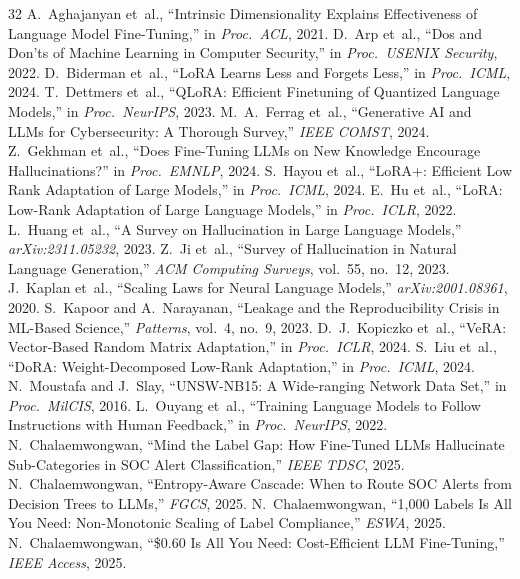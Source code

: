 \documentclass[journal]{IEEEtran}
\begin{document}
\begin{thebibliography}{32}
 A.~Aghajanyan et~al., ``Intrinsic Dimensionality Explains Effectiveness of Language Model Fine-Tuning,'' in \emph{Proc.\ ACL}, 2021.
 D.~Arp et~al., ``Dos and Don'ts of Machine Learning in Computer Security,'' in \emph{Proc.\ USENIX Security}, 2022.
 D.~Biderman et~al., ``LoRA Learns Less and Forgets Less,'' in \emph{Proc.\ ICML}, 2024.
 T.~Dettmers et~al., ``QLoRA: Efficient Finetuning of Quantized Language Models,'' in \emph{Proc.\ NeurIPS}, 2023.
 M.~A.~Ferrag et~al., ``Generative AI and LLMs for Cybersecurity: A Thorough Survey,'' \emph{IEEE COMST}, 2024.
 Z.~Gekhman et~al., ``Does Fine-Tuning LLMs on New Knowledge Encourage Hallucinations?'' in \emph{Proc.\ EMNLP}, 2024.
 S.~Hayou et~al., ``LoRA+: Efficient Low Rank Adaptation of Large Models,'' in \emph{Proc.\ ICML}, 2024.
 E.~Hu et~al., ``LoRA: Low-Rank Adaptation of Large Language Models,'' in \emph{Proc.\ ICLR}, 2022.
 L.~Huang et~al., ``A Survey on Hallucination in Large Language Models,'' \emph{arXiv:2311.05232}, 2023.
 Z.~Ji et~al., ``Survey of Hallucination in Natural Language Generation,'' \emph{ACM Computing Surveys}, vol.~55, no.~12, 2023.
 J.~Kaplan et~al., ``Scaling Laws for Neural Language Models,'' \emph{arXiv:2001.08361}, 2020.
 S.~Kapoor and A.~Narayanan, ``Leakage and the Reproducibility Crisis in ML-Based Science,'' \emph{Patterns}, vol.~4, no.~9, 2023.
 D.~J.~Kopiczko et~al., ``VeRA: Vector-Based Random Matrix Adaptation,'' in \emph{Proc.\ ICLR}, 2024.
 S.~Liu et~al., ``DoRA: Weight-Decomposed Low-Rank Adaptation,'' in \emph{Proc.\ ICML}, 2024.
 N.~Moustafa and J.~Slay, ``UNSW-NB15: A Wide-ranging Network Data Set,'' in \emph{Proc.\ MilCIS}, 2016.
 L.~Ouyang et~al., ``Training Language Models to Follow Instructions with Human Feedback,'' in \emph{Proc.\ NeurIPS}, 2022.
 N.~Chalaemwongwan, ``Mind the Label Gap: How Fine-Tuned LLMs Hallucinate Sub-Categories in SOC Alert Classification,'' \emph{IEEE TDSC}, 2025.
 N.~Chalaemwongwan, ``Entropy-Aware Cascade: When to Route SOC Alerts from Decision Trees to LLMs,'' \emph{FGCS}, 2025.
 N.~Chalaemwongwan, ``1,000 Labels Is All You Need: Non-Monotonic Scaling of Label Compliance,'' \emph{ESWA}, 2025.
 N.~Chalaemwongwan, ``\$0.60 Is All You Need: Cost-Efficient LLM Fine-Tuning,'' \emph{IEEE Access}, 2025.

\end{thebibliography}
\end{document}
